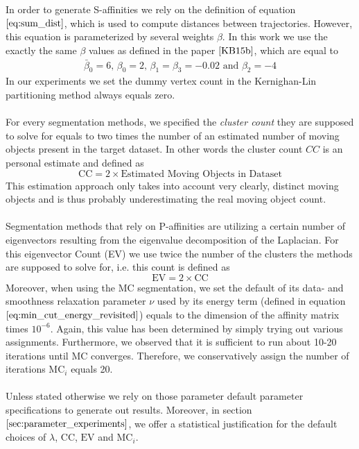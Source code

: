 In order to generate S-affinities we rely on the definition of equation $\ref{eq:sum_dist}$, which is used to compute distances between trajectories. However, this equation is parameterized by several weights $\beta$. In this work we use the exactly the same $\beta$ values as defined in the paper $\cite{KB15b}$, which are equal to
\begin{equation}
\begin{aligned}
\bar{\beta}_0 = 6 \text{, } \beta_0 = 2 \text{, } \beta_1 = \beta_3 = -0.02 \text{ and } \beta_2 = -4
\end{aligned}
\end{equation}
In our experiments we set the dummy vertex count in the Kernighan-Lin partitioning method always equals zero. \\ \\
For every segmentation methods, we specified the \textit{cluster count} they are supposed to solve for equals to two times the number of an estimated number of moving objects present in the target dataset. In other words the cluster count $CC$ is an personal estimate and defined as
\begin{equation}
	\text{CC} = 2 \times \text{Estimated Moving Objects in Dataset}
\label{eq:cc_def} 
\end{equation}
This estimation approach only takes into account very clearly, distinct moving objects and is thus probably underestimating the real moving object count. \\ \\
Segmentation methods that rely on P-affinities are utilizing a certain number of eigenvectors resulting from the eigenvalue decomposition of the Laplacian. For this eigenvector Count (EV) we use twice the number of the clusters the methods are supposed to solve for, i.e. this count is defined as
\begin{equation}
	\text{EV} = 2 \times \text{CC}
\end{equation}
Moreover, when using the MC segmentation, we set the default of its data- and smoothness relaxation parameter $\nu$ used by its energy term (defined in equation $\ref{eq:min_cut_energy_revisited}$) equals to the dimension of the affinity matrix times $10^{-6}$. Again, this value has been determined by simply trying out various assignments. Furthermore, we observed that it is sufficient to run about 10-20 iterations until MC converges. Therefore, we conservatively assign the number of iterations $\text{MC}_i$ equals 20. \\ \\
Unless stated otherwise we rely on those parameter default parameter specifications to generate out results. Moreover, in section $\ref{sec:parameter_experiments}$, we offer a statistical justification for the default choices of $\lambda$, $\text{CC}$, $\text{EV}$ and $\text{MC}_i$.

